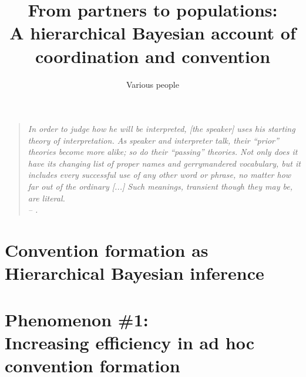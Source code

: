\documentclass[11pt, floatsintext]{apa6}
\title{From partners to populations: \\[.1em] A hierarchical Bayesian account of coordination and convention}
\author{Various people}
\affiliation{Various Universities}
\begin{document}
\maketitle

\begin{quote}
\emph{In order to judge how he will be interpreted, [the speaker] uses his starting theory of interpretation. %
As speaker and interpreter talk, their ``prior'' theories become more alike; so do their ``passing'' theories. 
Not only does it have its changing list of proper names and gerrymandered vocabulary, but it includes every successful use of any other word or phrase, no matter how far out of the ordinary [...] 
Such meanings, transient though they may be, are literal. \\-- .}

\end{quote}



\section{Convention formation as\\ Hierarchical Bayesian inference}



\section{Phenomenon \#1: \\ Increasing efficiency in ad hoc convention formation}
\end{document}
